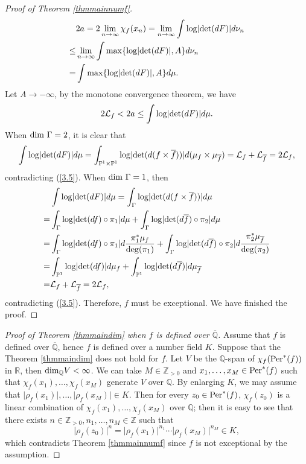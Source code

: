 \documentclass[12pt]{amsart}
\theoremstyle{plain}
\theoremstyle{remark}
\theoremstyle{definition}
\def\Z{\mathbb Z}
\def\Q{\mathbb Q}
\def\R{\mathbb R}
\def\P{\mathbb P}
\begin{document}
\begin{proof}[Proof of Theorem \ref{thmmainnumf}]
\begin{align*}
	&2a=2\lim\limits_{n\to\infty}\chi_f(x_n)=\lim\limits_{n\to\infty}\int{\rm log}\lvert{\rm det}(dF)\rvert d\nu_n\\
	\leq&\lim\limits_{n\to\infty}\int{\rm max}\{{\rm log}\lvert{\rm det}(dF)\rvert,A\} d\nu_n\\
	=&\int{\rm max}\{{\rm log}\lvert{\rm det}(dF)\rvert,A\} d\mu.
\end{align*}Let $A\to-\infty$, by the monotone convergence theorem, we have \begin{equation}\label{3.5}
2\mathcal{L}_f<2a\leq\int{\rm log}\lvert{\rm det}(dF)\rvert d\mu.
\end{equation}When ${\rm dim}\ \Gamma=2$, it is clear that $$\int{\rm log}\lvert{\rm det}(dF)\rvert d\mu=\int_{\P^1\times\P^1}{\rm log}\lvert{\rm det}(d(f\times\overline{f}))\rvert d(\mu_f\times\mu_{\overline{f}})=\mathcal{L}_f+\mathcal{L}_{\overline{f}}=2\mathcal{L}_f,$$ contradicting (\ref{3.5}). When ${\rm dim}\ \Gamma=1$, then\begin{align*}
&\int{\rm log}\lvert{\rm det}(dF)\rvert d\mu=\int_{\Gamma}{\rm log}\lvert{\rm det}(d(f\times\overline{f}))\rvert d\mu\\
=&\int_{\Gamma}{\rm log}\lvert{\rm det}(d f)\circ\pi_1\rvert d\mu+\int_{\Gamma}{\rm log}\lvert{\rm det}(d \overline{f})\circ \pi_2\rvert d\mu\\
=&\int_{\Gamma}{\rm log}\lvert{\rm det}(df)\circ\pi_1\rvert d\frac{\pi_1^*\mu_f}{{\rm deg}(\pi_1)}+\int_{\Gamma}{\rm log}\lvert{\rm det}(d\overline{f})\circ \pi_2\rvert d\frac{\pi_2^*\mu_{\overline{f}}}{{\rm deg}(\pi_2)}\\
=&\int_{\P^1}{\rm log}\lvert{\rm det}(df)\rvert d\mu_f+\int_{\P^1}{\rm log}\lvert{\rm det}(d\overline{f})\rvert d\mu_{\overline{f}}\\
=&\mathcal{L}_f+\mathcal{L}_{\overline{f}}=2\mathcal{L}_f,
\end{align*}contradicting (\ref{3.5}). Therefore, $f$ must be exceptional. We have finished the proof. 
\end{proof}
\begin{proof}[Proof of Theorem \ref{thmmaindim} when $f$ is defined over $\overline{\Q}$]
	Assume that $f$ is defined over $\overline{\Q}$, hence $f$ is defined over a number field $K$. Suppose that the Theorem \ref{thmmaindim} does not hold for $f$. Let $V$ be the $\Q$-span of $\chi_f({\rm Per}^*(f))$ in $\R$, then ${\rm dim}_{\Q}V<\infty$. We can take $M\in\Z_{>0}$ and $x_1,\dots,x_M\in{\rm Per}^*(f)$ such that $\chi_f(x_1),\dots,\chi_f(x_M)$ generate $V$ over $\Q$. By enlarging $K$, we may assume that  $\lvert\rho_f(x_1)\rvert,\dots,\lvert\rho_f(x_M)\rvert\in K$. Then for every $z_0\in{\rm Per}^*(f)$, $\chi_f(z_0)$ is a linear combination of $\chi_f(x_1),\dots,\chi_f(x_M)$ over $\Q$; then it is easy to see that there exists $n\in\Z_{>0},n_1,\dots,n_M\in\Z$ such that$$\lvert\rho_f(z_0)\rvert^n=\lvert\rho_f(x_1)\rvert^{n_1}\cdots\lvert\rho_f(x_M)\rvert^{n_M}\in K,$$ which contradicts Theorem \ref{thmmainnumf} since $f$ is not exceptional by the assumption.
\end{proof}
\end{document}

